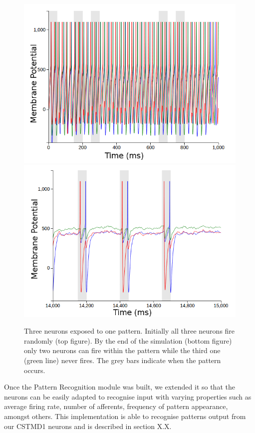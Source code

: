 \documentclass[a4paper,11pt]{article}
\begin{document}
\begin{figure}[H]
\centering
\includegraphics[scale = 0.4]{n3_start}
\includegraphics[scale = 0.4]{n3_end}
\caption{Three neurons exposed to one pattern. Initially all three neurons fire randomly (top figure). By the end of the simulation (bottom figure) only two neurons can fire within the pattern while the third one (green line) never fires. The grey bars indicate when the pattern occurs.}
\label{fig:3n1p}
\end{figure}


Once the Pattern Recognition module was built, we extended it so that the neurons can be easily adapted to recognise input with varying properties such as average firing rate, number of afferents, frequency of pattern appearance, amongst others. This implementation is able to recognise patterns output from our CSTMD1 neurons and is described in section X.X.
\end{document}
